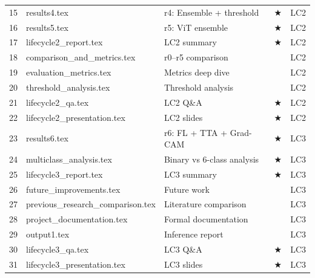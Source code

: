 \documentclass[12pt,a4paper]{article}
\begin{document}
\begin{center}
\begin{tabular}{cllcl}
    15 & results4.tex & r4: Ensemble + threshold & $\bigstar$ & LC2 \\
    16 & results5.tex & r5: ViT ensemble & $\bigstar$ & LC2 \\
    17 & lifecycle2\_report.tex & LC2 summary & $\bigstar$ & LC2 \\
    18 & comparison\_and\_metrics.tex & r0--r5 comparison & & LC2 \\
    19 & evaluation\_metrics.tex & Metrics deep dive & & LC2 \\
    20 & threshold\_analysis.tex & Threshold analysis & & LC2 \\
    21 & lifecycle2\_qa.tex & LC2 Q\&A & $\bigstar$ & LC2 \\
    22 & lifecycle2\_presentation.tex & LC2 slides & $\bigstar$ & LC2 \\
    \midrule
    23 & results6.tex & r6: FL + TTA + Grad-CAM & $\bigstar$ & LC3 \\
    24 & multiclass\_analysis.tex & Binary vs 6-class analysis & $\bigstar$ & LC3 \\
    25 & lifecycle3\_report.tex & LC3 summary & $\bigstar$ & LC3 \\
    26 & future\_improvements.tex & Future work & & LC3 \\
    27 & previous\_research\_comparison.tex & Literature comparison & & LC3 \\
    28 & project\_documentation.tex & Formal documentation & & LC3 \\
    29 & output1.tex & Inference report & & LC3 \\
    30 & lifecycle3\_qa.tex & LC3 Q\&A & $\bigstar$ & LC3 \\
    31 & lifecycle3\_presentation.tex & LC3 slides & $\bigstar$ & LC3 \\
    \bottomrule
\end{tabular}
\end{center}
\end{document}
